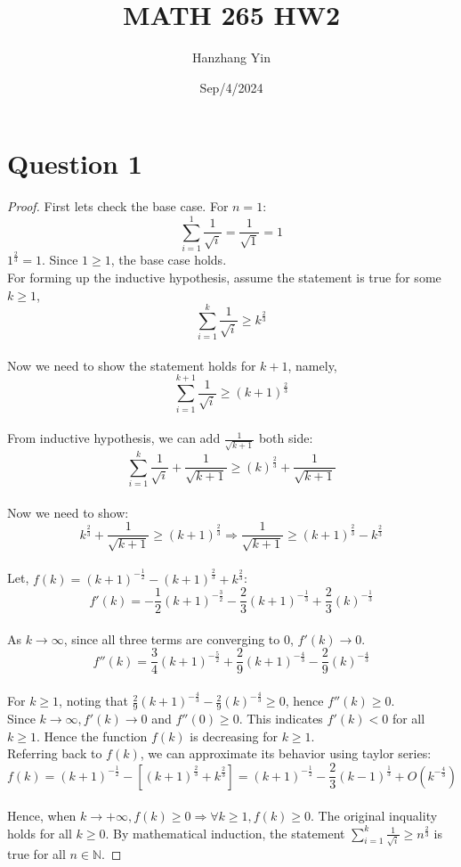 \documentclass{article}
\title{MATH 265 HW2}
\author{Hanzhang Yin}
\date{Sep/4/2024}
\begin{document}
\maketitle

\section*{Question 1}
\begin{proof}
    First lets check the base case. For $n = 1$: 
    \[ \sum_{i=1}^{1} \frac{1}{\sqrt{i}} = \frac{1}{\sqrt{1}} = 1 \]
    $1^{\frac{2}{3}} = 1$. Since $1 \geq 1$, the base case holds.
    \\
    For forming up the inductive hypothesis, assume the statement is true for some $k \geq 1$, 
    \[ \sum_{i=1}^{k} \frac{1}{\sqrt{i}} \geq k^{\frac{2}{3}}  \]
    \\
    Now we need to show the statement holds for $k + 1$, namely, 
    \[ \sum_{i=1}^{k+1} \frac{1}{\sqrt{i}} \geq (k + 1)^{\frac{2}{3}} \]
    \\
    From inductive hypothesis, we can add $\frac{1}{\sqrt{k+1}}$ both side:
    \[ \sum_{i=1}^{k} \frac{1}{\sqrt{i}} + \frac{1}{\sqrt{k + 1}} \geq (k)^{\frac{2}{3}} + \frac{1}{\sqrt{k + 1}} \]
    \\
    Now we need to show:
    \[ k^{\frac{2}{3}} + \frac{1}{\sqrt{k + 1}} \geq (k + 1)^{\frac{2}{3}} \Rightarrow \frac{1}{\sqrt{k + 1}} \geq (k + 1)^{\frac{2}{3}} - k^{\frac{2}{3}} \]
    \\
    Let, $f(k) = (k + 1)^{-\frac{1}{2}} - (k + 1)^{\frac{2}{3}} + k^{\frac{2}{3}}$:
    \[ f'(k) = -\frac{1}{2}(k + 1)^{-\frac{3}{2}} - \frac{2}{3}(k + 1)^{-\frac{1}{3}} + \frac{2}{3}(k)^{-\frac{1}{3}} \]
    \\
    As $k \rightarrow \infty$, since all three terms are converging to $0$, $f'(k) \rightarrow 0$. 
    \[ f''(k) = \frac{3}{4}(k + 1)^{-\frac{5}{2}} + \frac{2}{9}(k + 1)^{-\frac{4}{3}} - \frac{2}{9}(k)^{-\frac{4}{3}} \]
    \\
    For $k \geq 1$, noting that $\frac{2}{9}(k + 1)^{-\frac{4}{3}} - \frac{2}{9}(k)^{-\frac{4}{3}} \geq 0$, hence $f''(k) \geq 0$.
    \\
    Since $k \rightarrow \infty, f'(k) \rightarrow 0$ and $f''(0) \geq 0$. This indicates $f'(k) < 0$ for all $k \geq 1$. Hence the function $f(k)$ is decreasing for $k \geq 1$.
    \\
    Referring back to $f(k)$, we can approximate its behavior using taylor series:
    \[ f(k) = (k + 1)^{-\frac{1}{2}} - \left[ (k + 1)^{\frac{2}{3}} + k^{\frac{2}{3}} \right] = (k + 1)^{-\frac{1}{2}} - \frac{2}{3}(k - 1)^{\frac{1}{3}} + O(k^{-\frac{4}{3}}) \]
    \\
    Hence, when $k \rightarrow +\infty, f(k) \geq 0 \Rightarrow \forall k \geq 1, f(k) \geq 0$. The original inquality holds for all $k \geq 0$.
    By mathematical induction, the statement \( \sum_{i=1}^{k} \frac{1}{\sqrt{i}} \geq n^{\frac{2}{3}} \) is true for all $n \in \mathbb{N}$.
\end{proof}
\end{document}
